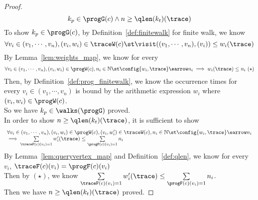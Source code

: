 \begin{proof}
\[
  k_p \in \progG(c) \land n \geq \qlen(k_t)(\trace)
  \] 
To show $k_p \in \progG(c)$, by Definition~\ref{def:finitewalk} for finite walk, 
we know
\[
  \forall v_i \in (v_1, \cdots, v_n), (v_i, w_i) \in \traceW(c) 
  \st
  \visit((v_1, \cdots, v_n), (v_i)) \leq w_i(\trace)
\]
%
By Lemma~\ref{lem:weights_map}, we know for every 
\[
  \forall v_i \in (v_1, \cdots, v_n), (v_i, w_i) \in \progW(c), n_i \in \mathbb{N} 
  \st
  \config{w_i, \trace} \earrow n_i
  \implies
   w_i(\trace) \leq n_i ~ (\star)
\]
Then, by Definition~\ref{def:prog_finitewalk}, we know
the occurrence times for every $v_i \in (v_1, \cdots, v_n)$ 
is bound by the arithmetic expression $w_i$ where $(v_i, w_i) \in \progW(c)$.
\\
So we have $k_p \in \walks(\progG)$ proved.
\\
In order to show $ n \geq \qlen(k_t)(\trace) $, it is sufficient to show
\[
  \begin{array}{l}
  \forall v_i \in (v_1, \cdots, v_n),
  (v_i, w_i) \in \progW(c), (v_i, w'_i) \in \traceW(c), n_i \in \mathbb{N} 
  \st
  \config{w_i, \trace} \earrow n_i
  \\
  \implies
   \sum\limits_{\traceF(c)(v_i) = 1}
   w'_i(\trace) 
   \leq 
   \sum\limits_{\progF(c)(v_i) = 1}n_i 
  \end{array}
  \]
By Lemma~\ref{lem:queryvertex_map} and Definition~\ref{def:qlen}, we know for every $v_i$, $\traceF(c)(v_i) = \progF(c)(v_i) $ 
\\
Then by $(\star)$, we know $  \sum\limits_{\traceF(c)(v_i) = 1}
w'_i(\trace) 
\leq 
\sum\limits_{\progF(c)(v_i) = 1}n_i $.
\\
Then we have $ n \geq \qlen(k_t)(\trace) $ proved.

\end{proof}
